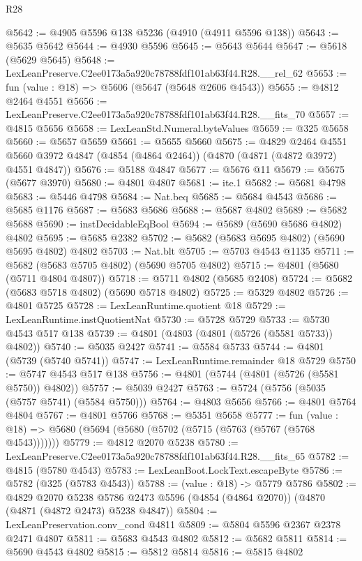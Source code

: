 \begin{lexlean}{R28}
\begin{coremodule}
@5642 := @4905 @5596 @138 @5236 (@4910 (@4911 @5596 @138))
@5643 := @5635 @5642
@5644 := @4930 @5596
@5645 := @5643 @5644
@5647 := @5618 (@5629 @5645)
@5648 := LexLeanPreserve.C2ee0173a5a920c78788fdf101ab63f44.R28.__rel_62
@5653 := fun (value : @18) => @5606 (@5647 (@5648 @2606 @4543))
@5655 := @4812 @2464 @4551
@5656 := LexLeanPreserve.C2ee0173a5a920c78788fdf101ab63f44.R28.__fits_70
@5657 := @4815 @5656
@5658 := LexLeanStd.Numeral.byteValues
@5659 := @325 @5658
@5660 := @5657 @5659
@5661 := @5655 @5660
@5675 := @4829
    @2464
    @4551
    @5660
    @3972
    @4847
    (@4854 (@4864 @2464))
    (@4870 (@4871 (@4872 @3972) @4551 @4847))
@5676 := @5188 @4847
@5677 := @5676 @11
@5679 := @5675 (@5677 @3970)
@5680 := @4801 @4807
@5681 := ite.{1}
@5682 := @5681 @4798
@5683 := @5446 @4798
@5684 := Nat.beq
@5685 := @5684 @4543
@5686 := @5685 @1176
@5687 := @5683 @5686
@5688 := @5687 @4802
@5689 := @5682 @5688
@5690 := instDecidableEqBool
@5694 := @5689 (@5690 @5686 @4802) @4802
@5695 := @5685 @2382
@5702 := @5682 (@5683 @5695 @4802) (@5690 @5695 @4802) @4802
@5703 := Nat.blt
@5705 := @5703 @4543 @1135
@5711 := @5682 (@5683 @5705 @4802) (@5690 @5705 @4802)
@5715 := @4801 (@5680 (@5711 @4804 @4807))
@5718 := @5711 @4802 (@5685 @2408)
@5724 := @5682 (@5683 @5718 @4802) (@5690 @5718 @4802)
@5725 := @5329 @4802
@5726 := @4801 @5725
@5728 := LexLeanRuntime.quotient @18
@5729 := LexLeanRuntime.instQuotientNat
@5730 := @5728 @5729
@5733 := @5730 @4543 @517 @138
@5739 := @4801 (@4803 (@4801 (@5726 (@5581 @5733)) @4802))
@5740 := @5035 @2427
@5741 := @5584 @5733
@5744 := @4801 (@5739 (@5740 @5741))
@5747 := LexLeanRuntime.remainder @18 @5729
@5750 := @5747 @4543 @517 @138
@5756 := @4801 (@5744 (@4801 (@5726 (@5581 @5750)) @4802))
@5757 := @5039 @2427
@5763 := @5724 (@5756 (@5035 (@5757 @5741) (@5584 @5750)))
@5764 := @4803 @5656
@5766 := @4801 @5764 @4804
@5767 := @4801 @5766
@5768 := @5351 @5658
@5777 := fun (value : @18) => @5680 (@5694 (@5680 (@5702 (@5715 (@5763 (@5767 (@5768 @4543)))))))
@5779 := @4812 @2070 @5238
@5780 := LexLeanPreserve.C2ee0173a5a920c78788fdf101ab63f44.R28.__fits_65
@5782 := @4815 (@5780 @4543)
@5783 := LexLeanBoot.LockText.escapeByte
@5786 := @5782 (@325 (@5783 @4543))
@5788 := (value : @18) -> @5779 @5786
@5802 := @4829
    @2070
    @5238
    @5786
    @2473
    @5596
    (@4854 (@4864 @2070))
    (@4870 (@4871 (@4872 @2473) @5238 @4847))
@5804 := LexLeanPreservation.conv_cond @4811
@5809 := @5804 @5596 @2367 @2378 @2471 @4807
@5811 := @5683 @4543 @4802
@5812 := @5682 @5811
@5814 := @5690 @4543 @4802
@5815 := @5812 @5814
@5816 := @5815 @4802

\end{coremodule}
\end{lexlean}
